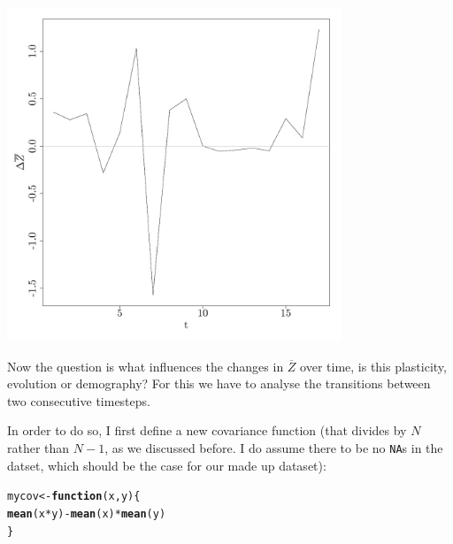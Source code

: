 \documentclass{article}\usepackage[]{graphicx}\usepackage[]{color}
\makeatletter
\newcommand{\hlopt}[1]{\textcolor[rgb]{0,0,0}{#1}}%
\newcommand{\hlstd}[1]{\textcolor[rgb]{0.345,0.345,0.345}{#1}}%
\newcommand{\hlkwa}[1]{\textcolor[rgb]{0.161,0.373,0.58}{\textbf{#1}}}%
\newcommand{\hlkwb}[1]{\textcolor[rgb]{0.69,0.353,0.396}{#1}}%
\newcommand{\hlkwc}[1]{\textcolor[rgb]{0.333,0.667,0.333}{#1}}%
\newcommand{\hlkwd}[1]{\textcolor[rgb]{0.737,0.353,0.396}{\textbf{#1}}}%
\newenvironment{kframe}{%
 \def\at@end@of@kframe{}%
 \ifinner\ifhmode%
  \def\at@end@of@kframe{\end{minipage}}%
  \begin{minipage}{\columnwidth}%
 \fi\fi%
 \def\FrameCommand##1{\hskip\@totalleftmargin \hskip-\fboxsep
 \colorbox{shadecolor}{##1}\hskip-\fboxsep
     \hskip-\linewidth \hskip-\@totalleftmargin \hskip\columnwidth}%
 \MakeFramed {\advance\hsize-\width
   \@totalleftmargin\z@ \linewidth\hsize
   \@setminipage}}%
 {\par\unskip\endMakeFramed%
 \at@end@of@kframe}
\newenvironment{knitrout}{}{} %
\makeatother
\begin{document}
\begin{knitrout}
\includegraphics[width=0.75\textwidth]{figure/bodymass_over_years2} 

\end{knitrout}

Now the question is what influences the changes in $\overline{Z}$ over time, is this plasticity, evolution or demography? For this we have to analyse the transitions between two consecutive timesteps.

In order to do so, I first define a new covariance function (that divides by $N$ rather than $N-1$, as we discussed before. I do assume there to be no \texttt{NA}s in the datset, which should be the case for our made up dataset):
\begin{knitrout}
\color{fgcolor}\begin{kframe}
\begin{alltt}
\hlstd{mycov}\hlkwb{<-}\hlkwa{function}\hlstd{(}\hlkwc{x}\hlstd{,}\hlkwc{y}\hlstd{)\{}
  \hlkwd{mean}\hlstd{(x}\hlopt{*}\hlstd{y)}\hlopt{-}\hlkwd{mean}\hlstd{(x)}\hlopt{*}\hlkwd{mean}\hlstd{(y)}
\hlstd{\}}
\end{alltt}
\end{kframe}
\end{knitrout}
\end{document}
